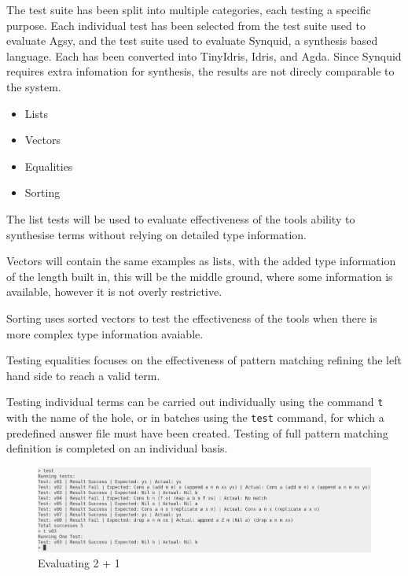 \documentclass[a4paper]{article}
\begin{document}
The test suite has been split into multiple categories, 
each testing a specific purpose. Each individual test 
has been selected from the test suite used to evaluate 
Agsy, and the test suite used to evaluate Synquid, a 
synthesis based language. Each has been converted into 
TinyIdris, Idris, and Agda. Since Synquid requires extra 
infomation for synthesis, the results are not direcly comparable
to the system. 

\begin{itemize}
\item Lists
\item Vectors
\item Equalities
\item Sorting
\end{itemize}

The list tests will be used to evaluate effectiveness of the
tools ability to synthesise terms without relying on detailed
type information. 

Vectors will contain the same examples as lists, with the added 
type information of the length built in, this will be the middle 
ground, where some information is available, however it is not 
overly restrictive. 

Sorting uses sorted vectors to test the effectiveness of the 
tools when there is more complex type information avaiable.

Testing equalities focuses on the effectiveness of pattern matching
refining the left hand side to reach  a valid term. 

Testing individual terms can be carried out individually using the 
command \texttt{t} with the name of the hole, or in batches using the \texttt{test}
command, for which a predefined answer file must have been created. 
Testing of full pattern matching definition is completed on an 
individual basis.  

\begin{center}
\begin{figure}[htbp]
\centering
\includegraphics[scale=0.20]{./Resource/batch-test.png}
\caption{Evaluating 2 + 1}
\end{figure}
\end{center}
\end{document}
